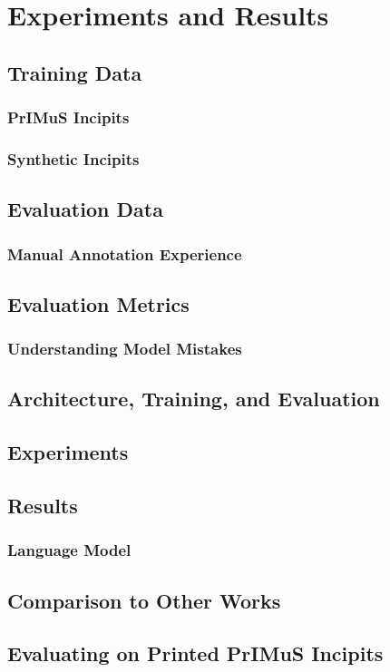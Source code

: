 \chapter{Experiments and Results}
\label{chap:ExperimentsAndResults}

\section{Training Data}

\subsection{PrIMuS Incipits}

\subsection{Synthetic Incipits}

\section{Evaluation Data}

\subsection{Manual Annotation Experience}

\section{Evaluation Metrics}

\subsection{Understanding Model Mistakes}

\section{Architecture, Training, and Evaluation}
\label{sec:ArchitectureTrainingEvaluation}

\section{Experiments}

\section{Results}

\subsection{Language Model}

\section{Comparison to Other Works}

\section{Evaluating on Printed PrIMuS Incipits}
